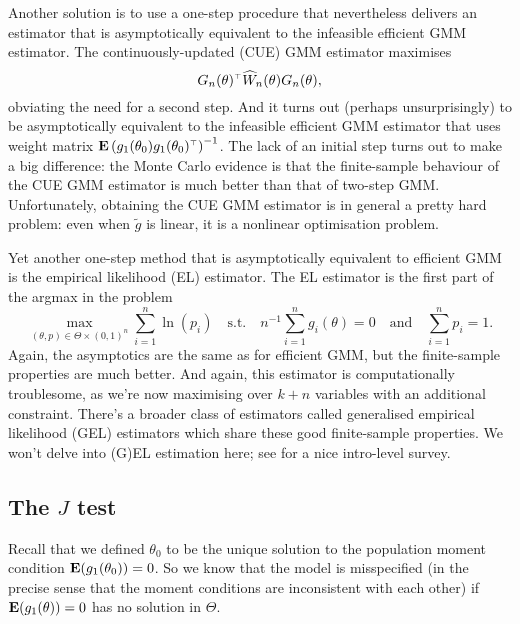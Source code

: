 \documentclass[11pt,letterpaper,reqno,oneside]{article}
\begin{document}
Another solution is to use a one-step procedure that nevertheless delivers an estimator that is asymptotically equivalent to the infeasible efficient GMM estimator. The continuously-updated (CUE) GMM estimator maximises
%
\begin{equation*}
	G_n(\theta)^{\scriptscriptstyle \top} \widehat{W}_n(\theta) G_n(\theta) ,
\end{equation*}
%
obviating the need for a second step. And it turns out (perhaps unsurprisingly) to be asymptotically equivalent to the infeasible efficient GMM estimator that uses weight matrix $\mathbf{E}\left( g_1(\theta_0) g_1(\theta_0)^{\scriptscriptstyle \top} \right)^{-1}$. The lack of an initial step turns out to make a big difference: the Monte Carlo evidence is that the finite-sample behaviour of the CUE GMM estimator is much better than that of two-step GMM. Unfortunately, obtaining the CUE GMM estimator is in general a pretty hard problem: even when $\widetilde{g}$ is linear, it is a nonlinear optimisation problem.

Yet another one-step method that is asymptotically equivalent to efficient GMM is the empirical likelihood (EL) estimator. The EL estimator is the first part of the argmax in the problem
%
\begin{equation*}
	\max_{ (\theta,p) \in \Theta \times (0,1)^n }
	\sum_{i=1}^n \ln(p_i)
	\quad\text{s.t.}\quad
	n^{-1} \sum_{i=1}^n g_i(\theta) = 0
	\quad\text{and}\quad \sum_{i=1}^n p_i = 1 .
\end{equation*}
%
Again, the asymptotics are the same as for efficient GMM, but the finite-sample properties are much better. And again, this estimator is computationally troublesome, as we're now maximising over $k+n$ variables with an additional constraint. There's a broader class of estimators called generalised empirical likelihood (GEL) estimators which share these good finite-sample properties. We won't delve into (G)EL estimation here; see \textcite{Imbens2002} for a nice intro-level survey.



\subsection{The \texorpdfstring{$J$}{J} test}
\label{sec:GMM:specification}

Recall that we defined $\theta_0$ to be the unique solution to the population moment condition $\mathbf{E}( g_1(\theta_0) ) = 0$. So we know that the model is misspecified (in the precise sense that the moment conditions are inconsistent with each other) if $\mathbf{E}( g_1(\theta) ) = 0$ has no solution in $\Theta$.
\end{document}
